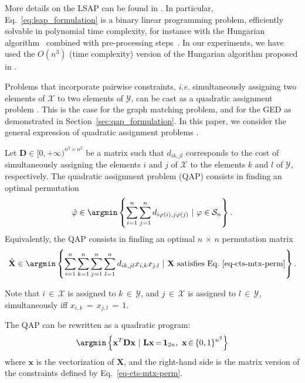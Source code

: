 More details on the LSAP can be found in \cite{sier01,bur09}. In particular, Eq.~\ref{eq:lsap_formulation} is a binary linear programming problem, efficiently solvable in polynomial time complexity, for instance with the Hungarian  algorithm~\cite{Kuhn1955,Munkres1957,law76} combined with pre-processing steps~\cite{Jonker1987}. In our experiments, we have used the $O(n^3)$ (time complexity) version of the Hungarian algorithm proposed in \cite{law76,bur09}.

Problems that incorporate pairwise constraints, \textit{i.e.} simultaneously assigning two elements of $\mathcal{X}$ to two elements of $\mathcal{Y}$, can be cast as a quadratic assignment problem \cite{koop57,Lowler1963,law76,Loiola2007,bur09}. This is the case for the graph matching problem, and for the GED as demonstrated in Section~\ref{sec:qap_formulation}. In this paper, we consider the general expression of quadratic assignment problems \cite{Lowler1963}.
\begin{definition}\label{def:qsap}
Let $\mathbf{D}\in[0,{+\infty})^{n^2\times n^2}$ be a matrix such that $d_{ik,jl}$ corresponds to the cost of simultaneously assigning the elements $i$ and $j$ of $\mathcal{X}$ to the elements $k$ and $l$ of $\mathcal{Y}$, respectively. The quadratic assignment problem (QAP) consists in finding an optimal permutation
\begin{equation}\label{eq:lowler_form}
\hat{\varphi}\in\argmin\left\{\sum_{i=1}^n\sum_{j=1}^n d_{i\varphi(i),j\varphi(j)}~|~\varphi\in\mathcal{S}_n\right\}.
\end{equation}
Equivalently, the QAP consists in finding an optimal $n\,{\times}\,n$ permutation matrix
\begin{equation*}
\hat{\mathbf{X}}\in\argmin\left\{\sum_{i=1}^n\sum_{k=1}^n\sum_{j=1}^n\sum_{l=1}^n d_{ik,jl}x_{i,k}x_{j,l}~|~\mathbf{X}~\text{satisfies Eq.~\ref{eq-cts-mtx-perm}}\right\}.
\end{equation*}
\end{definition}
Note that $i\,{\in}\,\mathcal{X}$ is assigned to $k\,{\in}\,\mathcal{Y}$, and $j\,{\in}\,\mathcal{X}$ is assigned to $l\,{\in}\,\mathcal{Y}$, simultaneously iff $x_{i,k}\,{=}\,x_{j,l}\,{=}\,1$.

The QAP can be rewritten as a quadratic program:
\begin{equation*}
\argmin\left\{\mathbf{x}^T\mathbf{D}\mathbf{x}~|~\mathbf{L}\mathbf{x}\,{=}\,\mathbf{1}_{2n},~\mathbf{x}\,{\in}\,\{0,1\}^{n^2}\right\}
\end{equation*}
where $\mathbf{x}$ is the vectorization of $\mathbf{X}$, and the right-hand side is the matrix version of the constraints defined by Eq.~\ref{eq-cts-mtx-perm}.

